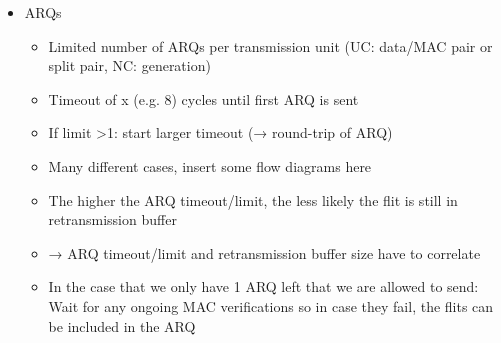 \begin{itemize}
\begin{itemize}
        \end{itemize}
    \item ARQs
        \begin{itemize}
            \item Limited number of ARQs per transmission unit (UC: data/MAC pair or split pair, NC: generation)
            \item Timeout of x (e.g. 8) cycles until first ARQ is sent
            \item If limit >1: start larger timeout (→ round-trip of ARQ)
            \item Many different cases, insert some flow diagrams here
            \item The higher the ARQ timeout/limit, the less likely the flit is still in retransmission buffer
            \item → ARQ timeout/limit and retransmission buffer size have to correlate
            \item In the case that we only have 1 ARQ left that we are allowed to send: Wait for any ongoing MAC verifications
                so in case they fail, the flits can be included in the ARQ
        \end{itemize}
\end{itemize}
\fi
